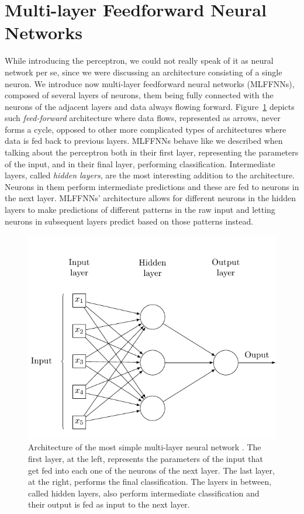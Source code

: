 
\section{Multi-layer Feedforward Neural Networks}
\label{sec:theory:mlffnn}

While introducing the perceptron, we could not really speak of it as neural network per se, since we were discussing an architecture consisting of a single neuron.
We introduce now multi-layer feedforward neural networks (MLFFNNs), composed of several layers of neurons, them being fully connected with the neurons of the adjacent layers and data always flowing forward.
Figure~\ref{fig:sec:theory:mlffnn} depicts such \emph{feed-forward} architecture where data flows, represented as arrows, never forms a cycle, opposed to other more complicated types of architectures where data is fed back to previous layers.
MLFFNNs behave like we described when talking about the perceptron both in their first layer, representing the parameters of the input, and in their final layer, performing classification.
Intermediate layers, called \emph{hidden layers}, are the most interesting addition to the architecture.
Neurons in them perform intermediate predictions and these are fed to neurons in the next layer.
MLFFNNs' architecture allows for different neurons in the hidden layers to make predictions of different patterns in the raw input and letting neurons in subsequent layers predict based on those patterns instead.

\begin{figure}[htb]
  \includegraphics[width=\textwidth]{tkz/mlffnn}
  \caption{Architecture of the most simple multi-layer neural network \cite{Medina2013A}.
  The first layer, at the left, represents the parameters of the input that get fed into each one of the neurons of the next layer.
  The last layer, at the right, performs the final classification.
  The layers in between, called hidden layers, also perform intermediate classification and their output is fed as input to the next layer.}
  \label{fig:sec:theory:mlffnn}
\end{figure}

